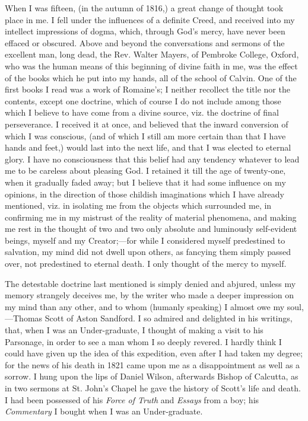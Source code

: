 When I was fifteen, (in the autumn of 1816,) a great change of
thought took place in me. I fell under the influences of a definite
Creed, and received into my intellect impressions of dogma, which,
through God's mercy, have never been effaced or obscured. Above and
beyond the conversations and sermons of the excellent man, long dead,
the Rev. Walter Mayers, of Pembroke College, Oxford, who was the
human means of this beginning of divine faith in me, was the effect of
the books which he put into my hands, all of the school of Calvin. One
of the first books I read was a work of Romaine's; I neither
recollect the title nor the contents, except one doctrine, which
of course I do not include among those which I believe to have come
from a divine source, viz. the doctrine of final perseverance. I
received it at once, and believed that the inward conversion of which
I was conscious, (and of which I still am more certain than that I
have hands and feet,) would last into the next life, and that I was
elected to eternal glory. I have no consciousness that this belief had
any tendency whatever to lead me to be careless about pleasing God. I
retained it till the age of twenty-one, when it gradually faded away;
but I believe that it had some influence on my opinions, in the
direction of those childish imaginations which I have already
mentioned, viz. in isolating me from the objects which surrounded me,
in confirming me in my mistrust of the reality of material phenomena,
and making me rest in the thought of two and two only absolute and luminously self-evident beings, myself and my Creator;—for
while I considered myself predestined to salvation, my mind did not dwell
upon others, as fancying them simply passed over, not predestined to eternal death. I only
thought of the mercy to myself.

The detestable doctrine last mentioned is simply denied and
abjured, unless my memory strangely deceives me, by the writer who
made a deeper impression on my mind than any other, and to whom
(humanly speaking) I almost owe my soul,—Thomas Scott of Aston
Sandford. I so admired and delighted in his writings, that, when I was
an Under-graduate, I thought of making a visit to his Parsonage, in
order to see a man whom I so deeply revered. I hardly think I could
have given up the idea of this expedition, even after I had taken my
degree; for the news of his death in 1821 came upon me as a
disappointment as well as a sorrow. I hung upon the lips of Daniel
Wilson, afterwards Bishop of Calcutta, as in two sermons at St. John's
Chapel he gave the history of Scott's life and death. I had been
possessed of his \emph{Force of Truth} and \emph{Essays} from a
boy; his \emph{Commentary} I bought when I was an Under-graduate.


